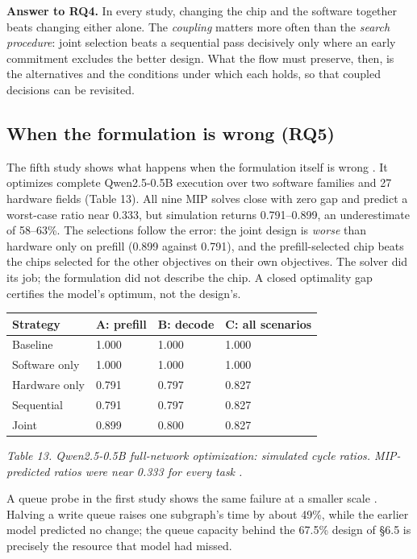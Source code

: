 \documentclass[11pt]{article}
\begin{document}
\textbf{Answer to RQ4.} In every study, changing the chip and the software together beats changing either alone. The \emph{coupling} matters more often than the \emph{search procedure}: joint selection beats a sequential pass decisively only where an early commitment excludes the better design. What the flow must preserve, then, is the alternatives and the conditions under which each holds, so that coupled decisions can be revisited.

\hypertarget{when-the-formulation-is-wrong-rq5}{%
\subsection{When the formulation is wrong (RQ5)}\label{when-the-formulation-is-wrong-rq5}}

The fifth study shows what happens when the formulation itself is wrong \cite{r100}. It optimizes complete Qwen2.5-0.5B execution over two software families and 27 hardware fields (Table 13). All nine MIP solves close with zero gap and predict a worst-case ratio near 0.333, but simulation returns 0.791--0.899, an underestimate of 58--63\%. The selections follow the error: the joint design is \emph{worse} than hardware only on prefill (0.899 against 0.791), and the prefill-selected chip beats the chips selected for the other objectives on their own objectives. The solver did its job; the formulation did not describe the chip. A closed optimality gap certifies the model's optimum, not the design's.

\begin{longtable}[]{@{}llll@{}}
\toprule\noalign{}
Strategy & A: prefill & B: decode & C: all scenarios \\
\midrule\noalign{}
\endhead
\bottomrule\noalign{}
\endlastfoot
Baseline & 1.000 & 1.000 & 1.000 \\
Software only & 1.000 & 1.000 & 1.000 \\
Hardware only & 0.791 & 0.797 & 0.827 \\
Sequential & 0.791 & 0.797 & 0.827 \\
Joint & 0.899 & 0.800 & 0.827 \\
\end{longtable}

\emph{Table 13. Qwen2.5-0.5B full-network optimization: simulated cycle ratios. MIP-predicted ratios were near 0.333 for every task \cite{r100}.}

A queue probe in the first study shows the same failure at a smaller scale \cite{r96}. Halving a write queue raises one subgraph's time by about 49\%, while the earlier model predicted no change; the queue capacity behind the 67.5\% design of §6.5 is precisely the resource that model had missed.
\end{document}
